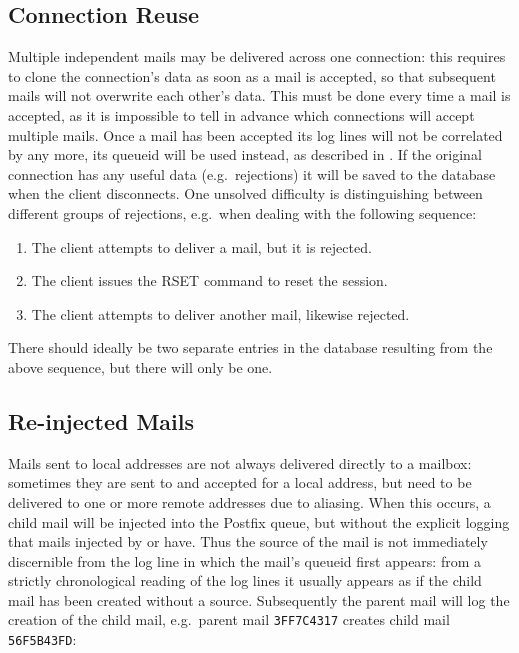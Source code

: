 \subsection{Connection Reuse}

\label{connection reuse}

Multiple independent mails may be delivered across one connection: this
requires \parsername{} to clone the connection's data as soon as a mail is
accepted, so that subsequent mails will not overwrite each other's data.
This must be done every time a mail is accepted, as it is impossible to
tell in advance which connections will accept multiple mails.  Once a mail
has been accepted its log lines will not be correlated by  any
more, its queueid will be used instead, as described in .  If the original connection has any useful data (e.g.\ rejections)
it will be saved to the database when the client disconnects.  One unsolved
difficulty is distinguishing between different groups of rejections, e.g.\
when dealing with the following sequence:

\begin{enumerate}

    \item The client attempts to deliver a mail, but it is rejected.

    \item The client issues the RSET command to reset the 
        session.

    \item The client attempts to deliver another mail, likewise rejected.

\end{enumerate}

There should ideally be two separate entries in the database resulting from
the above sequence, but there will only be one.



\subsection{Re-injected Mails}

\label{Re-injected mails}

\label{tracking re-injected mail}

Mails sent to local addresses are not always delivered directly to a
mailbox: sometimes they are sent to and accepted for a local address, but
need to be delivered to one or more remote addresses due to aliasing.  When
this occurs, a child mail will be injected into the Postfix queue, but
without the explicit logging that mails injected by \daemon{smtpd} or
\daemon{postdrop} have.  Thus the source of the mail is not immediately
discernible from the log line in which the mail's queueid first appears:
from a strictly chronological reading of the log lines it usually appears
as if the child mail has been created without a source.  Subsequently the
parent mail will log the creation of the child mail, e.g.\ parent mail
\texttt{3FF7C4317} creates child mail \texttt{56F5B43FD}\@:

